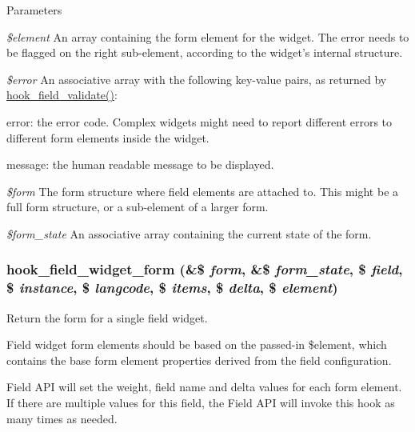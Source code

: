 \begin{DoxyParams}{Parameters}
\item[{\em \$element}]An array containing the form element for the widget. The error needs to be flagged on the right sub-\/element, according to the widget's internal structure. \item[{\em \$error}]An associative array with the following key-\/value pairs, as returned by \hyperlink{group__field__types_gaa7d8846e8fe3766e1b3435cd50b965be}{hook\_\-field\_\-validate()}:
\begin{DoxyItemize}
\item error: the error code. Complex widgets might need to report different errors to different form elements inside the widget.
\item message: the human readable message to be displayed. 
\end{DoxyItemize}\item[{\em \$form}]The form structure where field elements are attached to. This might be a full form structure, or a sub-\/element of a larger form. \item[{\em \$form\_\-state}]An associative array containing the current state of the form. \end{DoxyParams}
\hypertarget{group__field__widget_gaa9b0e55fd0eb57ac0f9c7c30d251971b}{
\subsubsection[{hook\_\-field\_\-widget\_\-form}]{\setlength{\rightskip}{0pt plus 5cm}hook\_\-field\_\-widget\_\-form (\&\$ {\em form}, \/  \&\$ {\em form\_\-state}, \/  \$ {\em field}, \/  \$ {\em instance}, \/  \$ {\em langcode}, \/  \$ {\em items}, \/  \$ {\em delta}, \/  \$ {\em element})}}
\label{group__field__widget_gaa9b0e55fd0eb57ac0f9c7c30d251971b}
Return the form for a single field widget.

Field widget form elements should be based on the passed-\/in \$element, which contains the base form element properties derived from the field configuration.

Field API will set the weight, field name and delta values for each form element. If there are multiple values for this field, the Field API will invoke this hook as many times as needed.

